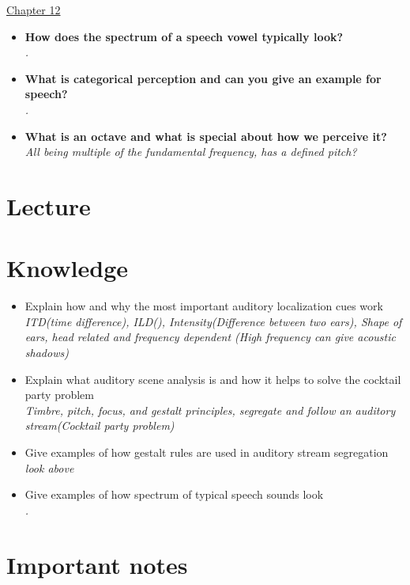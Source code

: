 \documentclass{article}
\begin{document}
\underline{Chapter 12}
\begin{itemize}
  \item \textbf{How does the spectrum of a speech vowel typically look?}\\
    \textit{.}
  \item \textbf{What is categorical perception and can you give an example for speech?}\\
    \textit{.}
  \item \textbf{What is an octave and what is special about how we perceive it?}\\
    \textit{All being multiple of the fundamental frequency, has a defined pitch?}
\end{itemize}


\section{Lecture}

\section{Knowledge}
\begin{itemize}
    \item Explain how and why the most important auditory localization cues work\\
        \textit{ITD(time difference), ILD(), Intensity(Difference between two ears), Shape of ears, head related and frequency dependent (High frequency can give acoustic shadows)}
    \item Explain what auditory scene analysis is and how it helps to solve the cocktail party problem\\
        \textit{Timbre, pitch, focus, and gestalt principles, segregate and follow an auditory stream(Cocktail party problem)}
    \item Give examples of how gestalt rules are used in auditory stream segregation\\
        \textit{look above}
    \item Give examples of how spectrum of typical speech sounds look\\
        \textit{.}
\end{itemize}

\section{Important notes}
\end{document}
